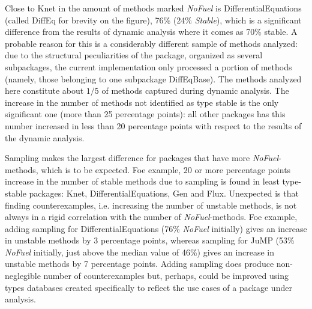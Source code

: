 Close to Knet in the amount of methods marked \emph{NoFuel} is
DifferentialEquations (called DiffEq for brevity on the figure), 76\% (24\%
\emph{Stable}), which is a significant difference from the results of dynamic
analysis where it comes as 70\% stable. A probable reason for this is a
considerably different sample of methods analyzed: due to the structural
peculiarities of the package, organized as several subpackages, the current
implementation only processed a portion of methods (namely, those belonging to
one subpackage DiffEqBase). The methods analyzed here constitute about $1/5$ of
methods captured during dynamic analysis. The increase in the number of methods
not identified as type stable is the only significant one (more than 25
percentage points): all other packages has this number increased in less
than 20 percentage points with respect to the results of the dynamic analysis.

Sampling makes the largest difference for packages that have more
\emph{NoFuel}-methods, which is to be expected. Foe example, $20$ or more
percentage points increase in the number of stable methods due to sampling is
found in least type-stable packages: Knet, DifferentialEquations, Gen and Flux.
Unexpected is that finding counterexamples, i.e. increasing
the number of unstable methods, is not always in a rigid correlation with the
number of \emph{NoFuel}-methods. Foe example, adding sampling for DifferentialEquations
(76\% \emph{NoFuel} initially) gives an increase in unstable methods by 3 percentage
points, whereas sampling for JuMP (53\% \emph{NoFuel} initially, just above the median value
of 46\%) gives an increase in unstable methods by 7 percentage points. Adding
sampling does produce non-neglegible number of counterexamples but, perhaps, could
be improved using types databases created specifically to reflect the use cases
of a package under analysis.
